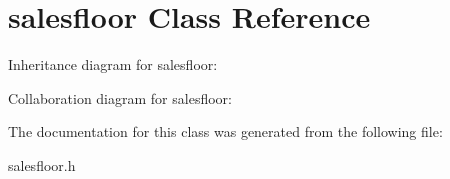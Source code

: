 \hypertarget{classsalesfloor}{}\section{salesfloor Class Reference}
\label{classsalesfloor}


Inheritance diagram for salesfloor\+:


Collaboration diagram for salesfloor\+:


The documentation for this class was generated from the following file\+:\begin{DoxyCompactItemize}
\item 
salesfloor.\+h\end{DoxyCompactItemize}
